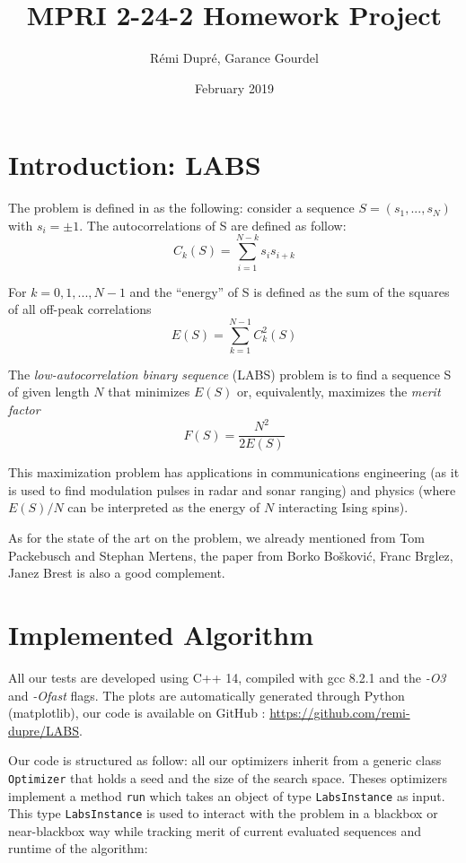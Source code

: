 \documentclass{article}
\title{MPRI 2-24-2 Homework Project}
\author{Rémi Dupré, Garance Gourdel}
\date{February 2019}
\begin{document}
\maketitle

\section{Introduction: LABS}

  The problem is defined in \cite{Packebusch_2016} as the following: consider a
  sequence $S = (s_1, ..., s_N)$ with $s_i = \pm 1$. The autocorrelations of S
  are defined as follow:
    $$C_k(S) = \sum\limits_{i=1}^{N-k} s_i s_{i+k}$$

  For $k = 0, 1, ..., N-1$ and the ``energy'' of S is defined as the sum of the
  squares of all off-peak correlations
    $$E(S) = \sum\limits_{k=1}^{N-1} C_k^2(S)$$

  The \textit{low-autocorrelation binary sequence} (LABS) problem is to find a
  sequence S of given length $N$ that minimizes $E(S)$ or, equivalently,
  maximizes the \textit{merit factor}
    $$F(S) = \frac{N^2}{2 E(S)}$$

  This maximization problem has applications in communications engineering (as
  it is used to find modulation pulses in radar and sonar ranging) and physics
  (where $E(S)/N$ can be interpreted as the energy of $N$ interacting Ising
  spins).

  As for the state of the art on the problem, we already mentioned
  \cite{Packebusch_2016} from Tom Packebusch and Stephan Mertens, the paper
  from Borko Bošković, Franc Brglez, Janez Brest
  \cite{DBLP:journals/asc/BoskovicBB17} is also a good complement.


\section{Implemented Algorithm}

  All our tests are developed using C++ 14, compiled with gcc 8.2.1 and the
  \textit{-O3} and \textit{-Ofast} flags. The plots are automatically generated
  through Python (matplotlib), our code is available on GitHub :
  \href{https://github.com/remi-dupre/LABS}{https://github.com/remi-dupre/LABS}.

  Our code is structured as follow: all our optimizers inherit from a generic
  class \texttt{Optimizer} that holds a seed and the size of the search space.
  Theses optimizers implement a method \texttt{run} which takes an object of
  type \texttt{LabsInstance} as input. This type \texttt{LabsInstance} is used
  to interact with the problem in a blackbox or near-blackbox way while
  tracking merit of current evaluated sequences and runtime of the algorithm:
\end{document}
